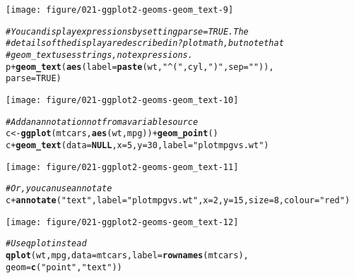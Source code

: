 \documentclass[a4paper,titlepage]{tufte-handout}\usepackage[]{graphicx}\usepackage[]{color}
\makeatletter
\def\maxwidth{ %
  \ifdim\Gin@nat@width>\linewidth
    \linewidth
  \else
    \Gin@nat@width
  \fi
}
\newcommand{\hlnum}[1]{\textcolor[rgb]{0.686,0.059,0.569}{#1}}%
\newcommand{\hlstr}[1]{\textcolor[rgb]{0.192,0.494,0.8}{#1}}%
\newcommand{\hlcom}[1]{\textcolor[rgb]{0.678,0.584,0.686}{\textit{#1}}}%
\newcommand{\hlopt}[1]{\textcolor[rgb]{0,0,0}{#1}}%
\newcommand{\hlstd}[1]{\textcolor[rgb]{0.345,0.345,0.345}{#1}}%
\newcommand{\hlkwa}[1]{\textcolor[rgb]{0.161,0.373,0.58}{\textbf{#1}}}%
\newcommand{\hlkwb}[1]{\textcolor[rgb]{0.69,0.353,0.396}{#1}}%
\newcommand{\hlkwc}[1]{\textcolor[rgb]{0.333,0.667,0.333}{#1}}%
\newcommand{\hlkwd}[1]{\textcolor[rgb]{0.737,0.353,0.396}{\textbf{#1}}}%
\newenvironment{kframe}{%
 \def\at@end@of@kframe{}%
 \ifinner\ifhmode%
  \def\at@end@of@kframe{\end{minipage}}%
  \begin{minipage}{\columnwidth}%
 \fi\fi%
 \def\FrameCommand##1{\hskip\@totalleftmargin \hskip-\fboxsep
 \colorbox{shadecolor}{##1}\hskip-\fboxsep
     \hskip-\linewidth \hskip-\@totalleftmargin \hskip\columnwidth}%
 \MakeFramed {\advance\hsize-\width
   \@totalleftmargin\z@ \linewidth\hsize
   \@setminipage}}%
 {\par\unskip\endMakeFramed%
 \at@end@of@kframe}
\newenvironment{knitrout}{}{} %
\makeatother
\begin{document}
\begin{knitrout}
\begin{kframe}
\begin{alltt}
\end{alltt}
\end{kframe}
\texttt{[image: figure/021-ggplot2-geoms-geom\_text-9]} 
\begin{kframe}\begin{alltt}
\hlcom{# You can display expressions by setting parse = TRUE.  The}
\hlcom{# details of the display are described in ?plotmath, but note that}
\hlcom{# geom_text uses strings, not expressions.}
\hlstd{p} \hlopt{+} \hlkwd{geom_text}\hlstd{(}\hlkwd{aes}\hlstd{(}\hlkwc{label} \hlstd{=} \hlkwd{paste}\hlstd{(wt,} \hlstr{"^("}\hlstd{, cyl,} \hlstr{")"}\hlstd{,} \hlkwc{sep} \hlstd{=} \hlstr{""}\hlstd{)),}
  \hlkwc{parse} \hlstd{=} \hlnum{TRUE}\hlstd{)}
\end{alltt}
\end{kframe}
\texttt{[image: figure/021-ggplot2-geoms-geom\_text-10]} 
\begin{kframe}\begin{alltt}
\hlcom{# Add an annotation not from a variable source}
\hlstd{c} \hlkwb{<-} \hlkwd{ggplot}\hlstd{(mtcars,} \hlkwd{aes}\hlstd{(wt, mpg))} \hlopt{+} \hlkwd{geom_point}\hlstd{()}
\hlstd{c} \hlopt{+} \hlkwd{geom_text}\hlstd{(}\hlkwc{data} \hlstd{=} \hlkwa{NULL}\hlstd{,} \hlkwc{x} \hlstd{=} \hlnum{5}\hlstd{,} \hlkwc{y} \hlstd{=} \hlnum{30}\hlstd{,} \hlkwc{label} \hlstd{=} \hlstr{"plot mpg vs. wt"}\hlstd{)}
\end{alltt}
\end{kframe}
\texttt{[image: figure/021-ggplot2-geoms-geom\_text-11]} 
\begin{kframe}\begin{alltt}
\hlcom{# Or, you can use annotate}
\hlstd{c} \hlopt{+} \hlkwd{annotate}\hlstd{(}\hlstr{"text"}\hlstd{,} \hlkwc{label} \hlstd{=} \hlstr{"plot mpg vs. wt"}\hlstd{,} \hlkwc{x} \hlstd{=} \hlnum{2}\hlstd{,} \hlkwc{y} \hlstd{=} \hlnum{15}\hlstd{,} \hlkwc{size} \hlstd{=} \hlnum{8}\hlstd{,} \hlkwc{colour} \hlstd{=} \hlstr{"red"}\hlstd{)}
\end{alltt}
\end{kframe}
\texttt{[image: figure/021-ggplot2-geoms-geom\_text-12]} 
\begin{kframe}\begin{alltt}
\hlcom{# Use qplot instead}
\hlkwd{qplot}\hlstd{(wt, mpg,} \hlkwc{data} \hlstd{= mtcars,} \hlkwc{label} \hlstd{=} \hlkwd{rownames}\hlstd{(mtcars),}
   \hlkwc{geom}\hlstd{=}\hlkwd{c}\hlstd{(}\hlstr{"point"}\hlstd{,} \hlstr{"text"}\hlstd{))}
\end{alltt}

\end{kframe}
\end{knitrout}
\end{document}
